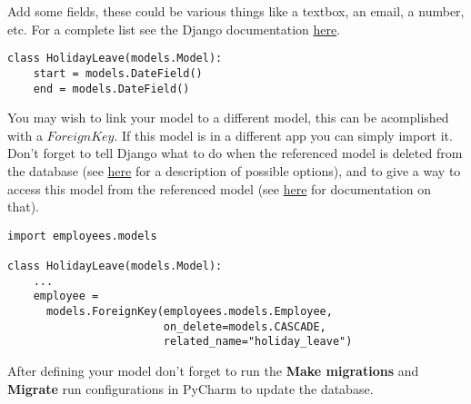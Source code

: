 \documentclass[12pt,a4paper]{article}
\begin{document}
Add some fields, these could be various things like a textbox, an email, a number, etc. For a complete list see the Django documentation \href{https://docs.djangoproject.com/en/2.1/ref/models/fields/#field-types}{here}.
\begin{verbatim}
class HolidayLeave(models.Model):
	start = models.DateField()
	end = models.DateField()
\end{verbatim}

You may wish to link your model to a different model, this can be acomplished with a $ForeignKey$. If this model is in a different app you can simply import it. Don't forget to tell Django what to do when the referenced model is deleted from the database (see \href{https://docs.djangoproject.com/en/2.1/ref/models/fields/#django.db.models.ForeignKey.on_delete}{here} for a description of possible options), and to give a way to access this model from the referenced model (see \href{https://docs.djangoproject.com/en/2.1/ref/models/fields/#django.db.models.ForeignKey.related_name}{here} for documentation on that).
\begin{verbatim}
import employees.models

class HolidayLeave(models.Model):
	...
	employee = 
	  models.ForeignKey(employees.models.Employee,
	                    on_delete=models.CASCADE,
	                    related_name="holiday_leave")
\end{verbatim}

After defining your model don't forget to run the \textbf{Make migrations} and \textbf{Migrate} run configurations in PyCharm to update the database.
\end{document}

